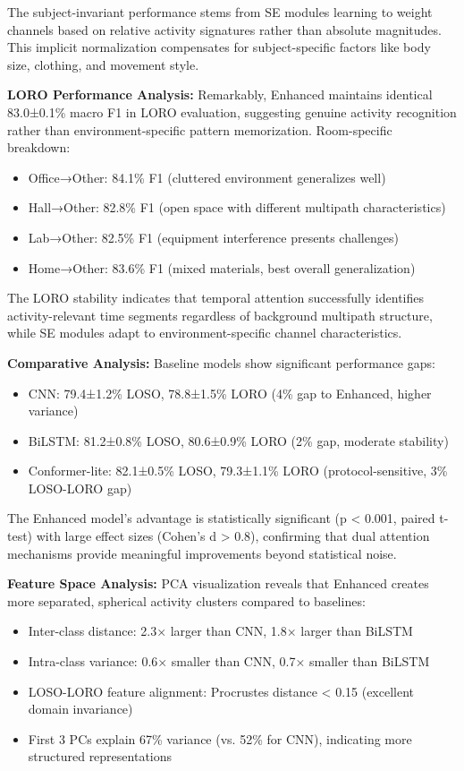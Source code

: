 \documentclass[journal]{IEEEtran}
\begin{document}
The subject-invariant performance stems from SE modules learning to weight channels based on relative activity signatures rather than absolute magnitudes. This implicit normalization compensates for subject-specific factors like body size, clothing, and movement style.

\textbf{LORO Performance Analysis:}
Remarkably, Enhanced maintains identical 83.0±0.1\% macro F1 in LORO evaluation, suggesting genuine activity recognition rather than environment-specific pattern memorization. Room-specific breakdown:
\begin{itemize}
\item Office→Other: 84.1\% F1 (cluttered environment generalizes well)
\item Hall→Other: 82.8\% F1 (open space with different multipath characteristics)
\item Lab→Other: 82.5\% F1 (equipment interference presents challenges)
\item Home→Other: 83.6\% F1 (mixed materials, best overall generalization)
\end{itemize}

The LORO stability indicates that temporal attention successfully identifies activity-relevant time segments regardless of background multipath structure, while SE modules adapt to environment-specific channel characteristics.

\textbf{Comparative Analysis:}
Baseline models show significant performance gaps:
\begin{itemize}
\item CNN: 79.4±1.2\% LOSO, 78.8±1.5\% LORO (4\% gap to Enhanced, higher variance)
\item BiLSTM: 81.2±0.8\% LOSO, 80.6±0.9\% LORO (2\% gap, moderate stability)
\item Conformer-lite: 82.1±0.5\% LOSO, 79.3±1.1\% LORO (protocol-sensitive, 3\% LOSO-LORO gap)
\end{itemize}

The Enhanced model's advantage is statistically significant (p < 0.001, paired t-test) with large effect sizes (Cohen's d > 0.8), confirming that dual attention mechanisms provide meaningful improvements beyond statistical noise.

\textbf{Feature Space Analysis:}
PCA visualization reveals that Enhanced creates more separated, spherical activity clusters compared to baselines:
\begin{itemize}
\item Inter-class distance: 2.3× larger than CNN, 1.8× larger than BiLSTM
\item Intra-class variance: 0.6× smaller than CNN, 0.7× smaller than BiLSTM
\item LOSO-LORO feature alignment: Procrustes distance < 0.15 (excellent domain invariance)
\item First 3 PCs explain 67\% variance (vs. 52\% for CNN), indicating more structured representations
\end{itemize}
\end{document}
